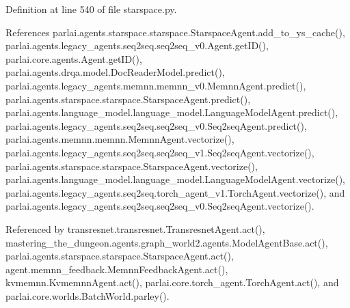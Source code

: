 Definition at line 540 of file starspace.\+py.



References parlai.\+agents.\+starspace.\+starspace.\+Starspace\+Agent.\+add\+\_\+to\+\_\+ys\+\_\+cache(), parlai.\+agents.\+legacy\+\_\+agents.\+seq2seq.\+seq2seq\+\_\+v0.\+Agent.\+get\+I\+D(), parlai.\+core.\+agents.\+Agent.\+get\+I\+D(), parlai.\+agents.\+drqa.\+model.\+Doc\+Reader\+Model.\+predict(), parlai.\+agents.\+legacy\+\_\+agents.\+memnn.\+memnn\+\_\+v0.\+Memnn\+Agent.\+predict(), parlai.\+agents.\+starspace.\+starspace.\+Starspace\+Agent.\+predict(), parlai.\+agents.\+language\+\_\+model.\+language\+\_\+model.\+Language\+Model\+Agent.\+predict(), parlai.\+agents.\+legacy\+\_\+agents.\+seq2seq.\+seq2seq\+\_\+v0.\+Seq2seq\+Agent.\+predict(), parlai.\+agents.\+memnn.\+memnn.\+Memnn\+Agent.\+vectorize(), parlai.\+agents.\+legacy\+\_\+agents.\+seq2seq.\+seq2seq\+\_\+v1.\+Seq2seq\+Agent.\+vectorize(), parlai.\+agents.\+starspace.\+starspace.\+Starspace\+Agent.\+vectorize(), parlai.\+agents.\+language\+\_\+model.\+language\+\_\+model.\+Language\+Model\+Agent.\+vectorize(), parlai.\+agents.\+legacy\+\_\+agents.\+seq2seq.\+torch\+\_\+agent\+\_\+v1.\+Torch\+Agent.\+vectorize(), and parlai.\+agents.\+legacy\+\_\+agents.\+seq2seq.\+seq2seq\+\_\+v0.\+Seq2seq\+Agent.\+vectorize().



Referenced by transresnet.\+transresnet.\+Transresnet\+Agent.\+act(), mastering\+\_\+the\+\_\+dungeon.\+agents.\+graph\+\_\+world2.\+agents.\+Model\+Agent\+Base.\+act(), parlai.\+agents.\+starspace.\+starspace.\+Starspace\+Agent.\+act(), agent.\+memnn\+\_\+feedback.\+Memnn\+Feedback\+Agent.\+act(), kvmemnn.\+Kvmemnn\+Agent.\+act(), parlai.\+core.\+torch\+\_\+agent.\+Torch\+Agent.\+act(), and parlai.\+core.\+worlds.\+Batch\+World.\+parley().

